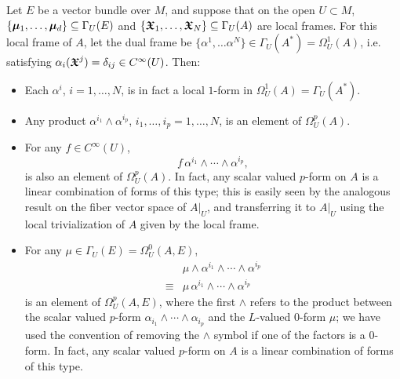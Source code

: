 \begin{remark}\label{remarkFormsInLocalFrameAreNiceWedgeProductsOf1Forms}
Let $E$ be a vector bundle over $M$, and suppose that on the open $U \subset M$, $\{\bm{\mu}_1, \dots, \bm{\mu}_d\} \subseteq \Gamma_U(E)$ and $\{\bm{\mathfrak{X}}_1, \dots, \bm{\mathfrak{X}}_N\} \subseteq \Gamma_U(A)$ are local frames. 
For this local frame of $A$, let the dual frame be $\{\alpha^1, \dots \alpha^N\} \in \Gamma_U(A^*) = \Omega_U^1(A)$, i.e. satisfying $\alpha_i(\bm{\mathfrak{X}}^j) = \delta_{ij} \in C^\infty(U)$. Then:

    \begin{itemize}
        
    \item Each $\alpha^i$, $i = 1, \dots, N$, is in fact a local $1$-form in $\Omega_U^1(A) = \Gamma_U(A^*)$.
    
    \item Any product $\alpha^{i_1} \wedge \alpha^{i_p}$, $i_1, \dots, i_p = 1, \dots, N$, is an element of $\Omega_U^p(A)$.
    
    \item For any $f \in C^\infty(U)$, 
    \begin{equation}
        f\, \alpha^{i_1} \wedge \cdots \wedge \alpha^{i_p},
    \end{equation} 
    is also an element of $\Omega_U^p(A)$. In fact, any scalar valued $p$-form on $A$ is a linear combination of forms of this type; this is easily seen by the analogous result on the fiber vector space of $A|_U$, and transferring it to $A|_U$ using the local trivialization of $A$ given by the local frame.
    
    \item For any $\mu \in \Gamma_U(E) = \Omega_U^0(A, E)$, 
    \begin{align}
        &\mu \wedge \alpha^{i_1} \wedge \cdots \wedge \alpha^{i_p}\\
        \equiv & \mu \, \alpha^{i_1} \wedge \cdots \wedge \alpha^{i_p}
    \end{align}
     is an element of $\Omega_U^p(A, E)$, where the first $\wedge$ refers to the product between the scalar valued $p$-form $\alpha_{i_1} \wedge \cdots \wedge \alpha_{i_p}$ and the $L$-valued $0$-form $\mu$; we have used the convention of removing the $\wedge$ symbol if one of the factors is a $0$-form. In fact, any scalar valued $p$-form on $A$ is a linear combination of forms of this type.
    

\end{itemize}
\end{remark}

